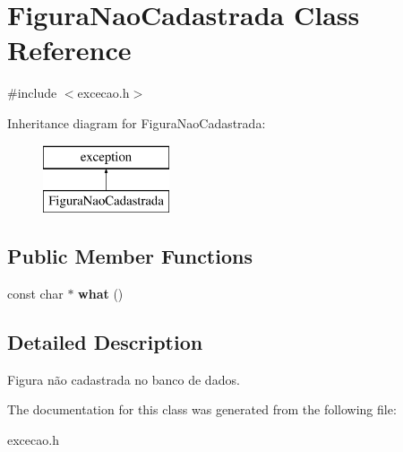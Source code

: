 \hypertarget{classFiguraNaoCadastrada}{}\section{Figura\+Nao\+Cadastrada Class Reference}
\label{classFiguraNaoCadastrada}


{\ttfamily \#include $<$excecao.\+h$>$}

Inheritance diagram for Figura\+Nao\+Cadastrada\+:\begin{figure}[H]
\begin{center}
\leavevmode
\includegraphics[height=2.000000cm]{classFiguraNaoCadastrada}
\end{center}
\end{figure}
\subsection*{Public Member Functions}
\begin{DoxyCompactItemize}
\item 
\mbox{\label{classFiguraNaoCadastrada_a1ed08ee074df9180eafca07728e2b455}} 
const char $\ast$ {\bfseries what} ()
\end{DoxyCompactItemize}


\subsection{Detailed Description}
Figura não cadastrada no banco de dados. 

The documentation for this class was generated from the following file\+:\begin{DoxyCompactItemize}
\item 
excecao.\+h\end{DoxyCompactItemize}
